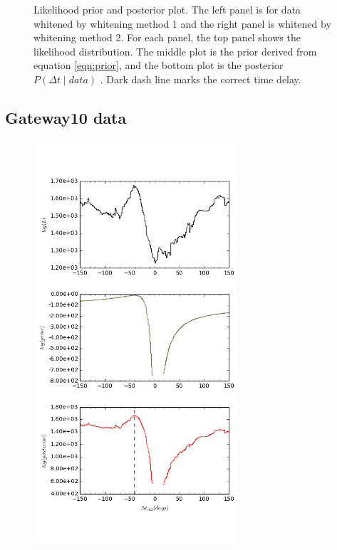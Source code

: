 \documentclass[\docopts]{\docclass}
\begin{document}
\begin{figure}[!h]
\begin{minipage}[bottom]{0.4\textwidth}
  \end{minipage}
 \caption{Likelihood prior and posterior plot. The left panel is for data whitened by whitening method 1 and the right panel is whitened by whitening method 2. For each panel, the top panel shows the likelihood distribution. The middle plot is the prior derived from equation \ref{eqn:prior}, and the bottom plot is the posterior $P(\Delta t \mid data)$ . Dark dash line marks the correct time delay. }
\end{figure}
\newpage

\subsection{Gateway10 data}

\begin{figure}[!h]
  \centering
  \begin{minipage}[bottom]{0.4\textwidth}
\includegraphics[width=\textwidth, height=15cm, keepaspectratio]{whiten1/data10_full_log.png}
  \end{minipage}
  \hfill
  \begin{minipage}[bottom]{0.4\textwidth}

\end{minipage}
\end{figure}
\end{document}
